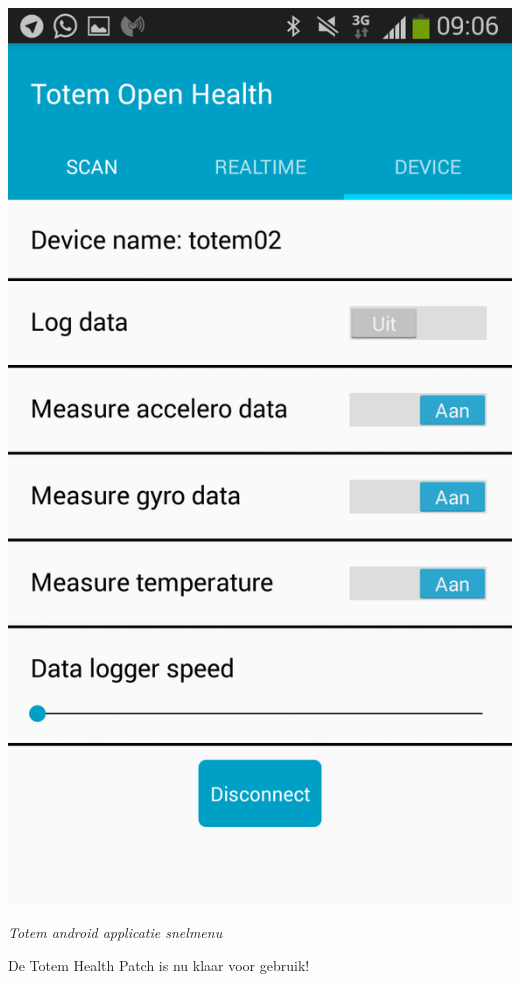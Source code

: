 \documentclass[conference]{IEEEtran}
\begin{document}
\begin{center}
    \includegraphics[scale=0.3]{apk3}
    \begin{minipage}{0.6\textwidth}
    \footnotesize
    \emph{Totem android applicatie snelmenu}
    \end{minipage}
\end{center}

De Totem Health Patch is nu klaar voor gebruik!
\end{document}
